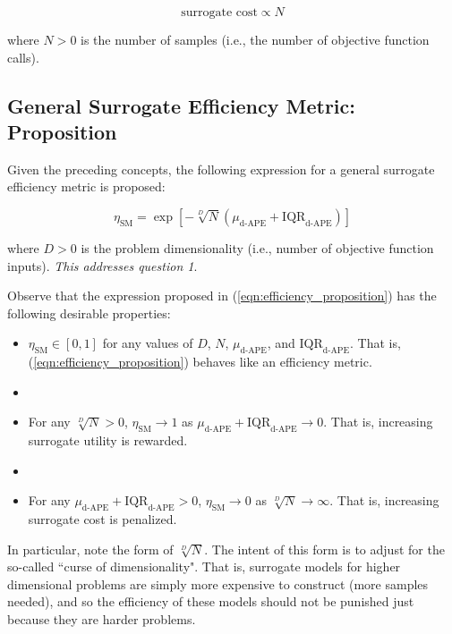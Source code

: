 \documentclass[conference]{IEEEtran}
\begin{document}
\begin{equation}
	\textrm{surrogate cost} \propto N
	\label{eqn:surrogate_cost_concept}
\end{equation}

\noindent where $N > 0$ is the number of samples (i.e., the number of objective function calls).

\subsection{General Surrogate Efficiency Metric: Proposition}

Given the preceding concepts, the following expression for a general surrogate efficiency metric is proposed:

\begin{equation}
	\eta_\textrm{SM} = \exp\left[-\sqrt[D]{N}(\mu_\textrm{d-APE} + \textrm{IQR}_\textrm{d-APE})\right]
	\label{eqn:efficiency_proposition}
\end{equation}

\noindent where $D>0$ is the problem dimensionality (i.e., number of objective function inputs). \textit{This addresses question 1}.

	Observe that the expression proposed in (\ref{eqn:efficiency_proposition}) has the following desirable properties:

\begin{itemize}
	\item $\eta_\textrm{SM} \in [0,1]$ for any values of $D$, $N$, $\mu_\textrm{d-APE}$, and $\textrm{IQR}_\textrm{d-APE}$. That is, (\ref{eqn:efficiency_proposition}) behaves like an efficiency metric.
	\item []
	\item For any $\sqrt[D]{N} > 0$, $\eta_\textrm{SM} \to 1$ as $\mu_\textrm{d-APE} + \textrm{IQR}_\textrm{d-APE} \to 0$. That is, increasing surrogate utility is rewarded.
	\item []
	\item For any $\mu_\textrm{d-APE} + \textrm{IQR}_\textrm{d-APE} > 0$, $\eta_\textrm{SM} \to 0$ as $\sqrt[D]{N} \to \infty$. That is, increasing surrogate cost is penalized.
\end{itemize}

\noindent In particular, note the form of $\sqrt[D]{N}$. The intent of this form is to adjust for the so-called ``curse of dimensionality". That is, surrogate models for higher dimensional problems are simply more expensive to construct (more samples needed), and so the efficiency of these models should not be punished just because they are harder problems.
\end{document}
